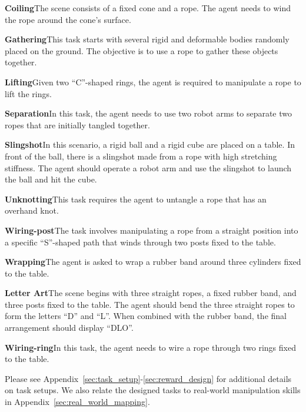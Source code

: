 \textbf{Coiling}\quad The scene consists of a fixed cone and a rope. The agent needs to wind the rope around the cone's surface.
\vspace{-1mm}

\textbf{Gathering}\quad This task starts with several rigid and deformable bodies randomly placed on the ground. The objective is to use a rope to gather these objects together.
\vspace{-1mm}

\textbf{Lifting}\quad Given two ``C''-shaped rings, the agent is required to manipulate a rope to lift the rings.
\vspace{-1mm}

\textbf{Separation}\quad In this task, the agent needs to use two robot arms to separate two ropes that are initially tangled together.
\vspace{-5mm}

\textbf{Slingshot}\quad In this scenario, a rigid ball and a rigid cube are placed on a table. In front of the ball, there is a slingshot made from a rope with high stretching stiffness. The agent should operate a robot arm and use the slingshot to launch the ball and hit the cube.
\vspace{-1mm}

\textbf{Unknotting}\quad This task requires the agent to untangle a rope that has an overhand knot.
\vspace{-1mm}

\textbf{Wiring-post}\quad The task involves manipulating a rope from a straight position into a specific ``S''-shaped path that winds through two posts fixed to the table.
\vspace{-1mm}

\textbf{Wrapping}\quad The agent is asked to wrap a rubber band around three cylinders fixed to the table.
\vspace{-1mm}

\textbf{Letter Art}\quad The scene begins with three straight ropes, a fixed rubber band, and three posts fixed to the table. The agent should bend the three straight ropes to form the letters ``D'' and ``L''. When combined with the rubber band, the final arrangement should display ``DLO''.
\vspace{-1mm}

\textbf{Wiring-ring}\quad In this task, the agent needs to wire a rope through two rings fixed to the table.

Please see Appendix~\ref{sec:task_setup}-\ref{sec:reward_design} for additional details on task setups. We also relate the designed tasks to real-world manipulation skills in Appendix~\ref{sec:real_world_mapping}.



